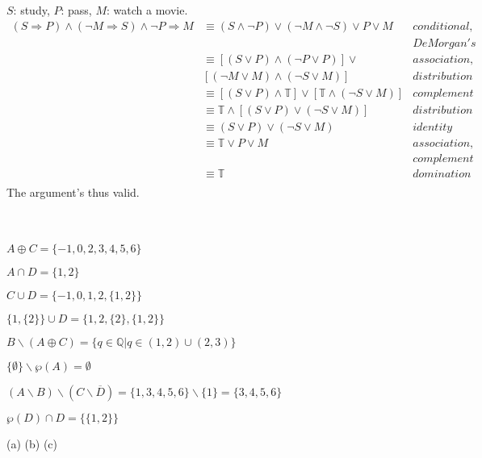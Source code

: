 \documentclass[a4paper, 11pt]{article}
\begin{document}
\begin{myEnumerate}
\begin{myEnumerate}
        \item $S$: study, $P$: pass, $M$: watch a movie. \\
        \(
        \begin{array}{llr}
        	(S \Rightarrow P) \land (\neg M \Rightarrow S) \land \neg P \Rightarrow M & \equiv (S \land \neg P) \lor (\neg M \land \neg S) \lor P \lor M & conditional, \\
            && DeMorgan's \\
            & \equiv [(S \lor P) \land (\neg P \lor P)] \lor & association, \\
            & [(\neg M \lor M) \land (\neg S \lor M)] & distribution \\
            & \equiv [(S \lor P) \land \mathbb{T}] \lor [\mathbb{T} \land (\neg S \lor M)] & complement \\
            & \equiv \mathbb{T} \land [(S\lor P)\lor (\neg S\lor M)] & distribution \\
            & \equiv (S\lor P)\lor (\neg S\lor M) & identity \\
            & \equiv \mathbb{T}\lor P\lor M & association, \\
            && complement \\
            & \equiv \mathbb{T} & domination \\
        \end{array}
        \)
        \\
        The argument's thus valid. \\\\\\

    \end{myEnumerate}

    \item
    \begin{myEnumerate}
    	\item $A\oplus C=\{-1, 0, 2, 3, 4, 5, 6\}$
        \item $A\cap D=\{1, 2\}$
        \item $C\cup D=\{-1, 0, 1, 2, \{1, 2\}\}$
        \item $\{1, \{2\}\}\cup D= \{1, 2, \{2\}, \{1, 2\}\}$
        \item $B \backslash (A\oplus C)=\{q\in \mathbb{Q}|q\in (1, 2)\cup (2, 3)\}$
        \item $\{\emptyset \}\backslash \wp(A)=\emptyset$
        \item $(A\backslash B)\backslash (C\backslash \overline{D})=\{1, 3, 4, 5, 6\}\backslash \{1\}=\{3, 4, 5, 6\}$
        \item $\wp(D)\cap D=\{\{1, 2\}\}$ \\
    \end{myEnumerate}

    \item (a) \hspace{4.5cm} (b) \hspace{4.5cm} (c)

\end{myEnumerate}
\end{document}
